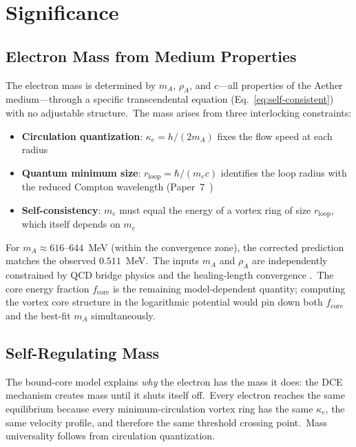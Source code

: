 \documentclass[12pt,letterpaper]{article}
\newcommand{\rhoa}{\rho_{\!A}}
\newcommand{\rloop}{r_{\mathrm{loop}}}
\begin{document}
\section{Significance}
\label{sec:significance}

\subsection{Electron Mass from Medium Properties}

The electron mass is determined by $m_A$, $\rhoa$, and $c$---all
properties of the Aether medium---through a specific transcendental equation
(Eq.~\ref{eq:self-consistent}) with no adjustable structure.\ The mass
arises from three interlocking constraints:

\begin{itemize}[leftmargin=2em]
  \item \textbf{Circulation quantization}: $\kappa_e = h/(2m_A)$ fixes the
    flow speed at each radius
  \item \textbf{Quantum minimum size}: $\rloop = \hbar/(m_e c)$ identifies
    the loop radius with the reduced Compton wavelength
    (Paper~7~\cite{otto-quantum})
  \item \textbf{Self-consistency}: $m_e$ must equal the energy of a vortex
    ring of size $\rloop$, which itself depends on $m_e$
\end{itemize}

For $m_A \approx 616$--$644$~MeV (within the convergence zone), the
corrected prediction matches the observed $0.511$~MeV.\ The inputs $m_A$ and
$\rhoa$ are independently constrained by QCD bridge physics
\cite{otto-strong} and the healing-length convergence
\cite{otto-quantum}.\ The core energy fraction $f_{\mathrm{core}}$ is the
remaining model-dependent quantity; computing the vortex core structure in the
logarithmic potential would pin down both $f_{\mathrm{core}}$ and the
best-fit $m_A$ simultaneously.

\subsection{Self-Regulating Mass}

The bound-core model explains \emph{why} the electron has the mass it
does: the DCE mechanism creates mass until it shuts itself off.\ Every
electron reaches the same equilibrium because every minimum-circulation
vortex ring has the same $\kappa_e$, the same velocity profile, and
therefore the same threshold crossing point.\ Mass universality follows from
circulation quantization.
\end{document}
